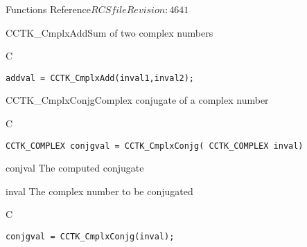 \begin{cactuspart}{ Functions Reference}{$RCSfile$}{$Revision: 4641 $}
\begin{FunctionDescription}{CCTK\_CmplxAdd}{Sum of two complex numbers}
\begin{ExampleSection}
\begin{Example}{C}
\begin{verbatim}
addval = CCTK_CmplxAdd(inval1,inval2);
\end{verbatim}
\end{Example}
\end{ExampleSection}
\end{FunctionDescription}

\begin{FunctionDescription}{CCTK\_CmplxConjg}{Complex conjugate of a complex number}
\label{CCTK-CmplxConjg}
\begin{SynopsisSection}
\begin{Synopsis}{C}
\begin{verbatim}CCTK_COMPLEX conjgval = CCTK_CmplxConjg( CCTK_COMPLEX inval)\end{verbatim}
\end{Synopsis}
\end{SynopsisSection}
\begin{ParameterSection}
\begin{Parameter}{conjval}
The computed conjugate
\end{Parameter}
\begin{Parameter}{inval}
The complex number to be conjugated
\end{Parameter}
\end{ParameterSection}

\begin{ExampleSection}
\begin{Example}{C}
\begin{verbatim}
conjgval = CCTK_CmplxConjg(inval);
\end{verbatim}
\end{Example}
\end{ExampleSection}
\end{FunctionDescription}


\end{cactuspart}
